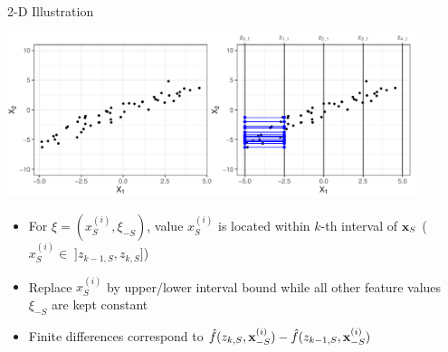 \documentclass[11pt,compress,t,notes=noshow, aspectratio=169, xcolor=table]{beamer}
\begin{document}
\begin{frame}{2-D Illustration}
\centerline{\includegraphics[width=0.9\textwidth]{figure/ale_interval}}

 \begin{itemize}
  \item For $\xi = (x_S^{(i)}, \xi_{-S})$, value $x_S^{(i)}$ is located within $k$-th interval of $\xv_S$ ($x_S^{(i)} \in \; ]z_{k-1, S}, z_{k, S}]$)
  \item Replace $x_S^{(i)}$ by upper/lower interval bound while all other feature values $\xi_{-S}$ are kept constant
  \item Finite differences correspond to $\fh(z_{k, S}, \xi_{-S}) - \fh(z_{k-1, S}, \xi_{-S})$
\end{itemize}

\end{frame}
\end{document}
